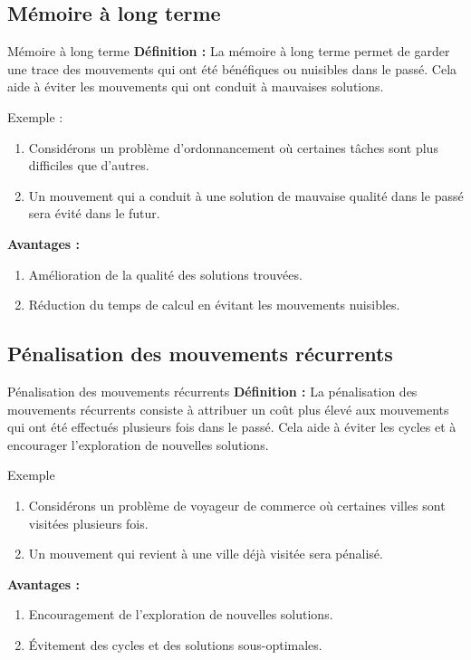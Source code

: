 \documentclass[10pt, handout]{beamer}
\begin{document}
\subsection{Mémoire à long terme}
\begin{frame}{Mémoire à long terme}
    \textbf{Définition :} 
    La mémoire à long terme permet de garder une trace des mouvements qui ont été bénéfiques ou nuisibles dans le passé. Cela aide à éviter les mouvements qui ont conduit à mauvaises solutions.
    
    \bigskip

    \begin{exampleblock}{Exemple :}
        \begin{enumerate}
            \item Considérons un problème d'ordonnancement où certaines tâches sont plus
                  difficiles que d'autres.
            \item Un mouvement qui a conduit à une solution de mauvaise qualité dans le passé
                  sera évité dans le futur.
        \end{enumerate}
    \end{exampleblock}
    \bigskip
    \textbf{Avantages :}
    \begin{enumerate}
        \item Amélioration de la qualité des solutions trouvées.
        \item Réduction du temps de calcul en évitant les mouvements nuisibles.
    \end{enumerate}
\end{frame}

\subsection{Pénalisation des mouvements récurrents}
\begin{frame}{Pénalisation des mouvements récurrents}
    \textbf{Définition :} 
    La pénalisation des mouvements récurrents consiste à attribuer un coût plus élevé aux mouvements qui ont été effectués plusieurs fois dans le passé. Cela aide à éviter les cycles et à encourager l'exploration de nouvelles solutions.

    \bigskip

    \begin{exampleblock}{Exemple}
        \begin{enumerate}
            \item Considérons un problème de voyageur de commerce où certaines villes sont
                  visitées plusieurs fois.
            \item Un mouvement qui revient à une ville déjà visitée sera pénalisé.
        \end{enumerate}
    \end{exampleblock}
    \bigskip
    \textbf{Avantages :}
    \begin{enumerate}
        \item Encouragement de l'exploration de nouvelles solutions.
        \item Évitement des cycles et des solutions sous-optimales.
    \end{enumerate}
\end{frame}
\end{document}
